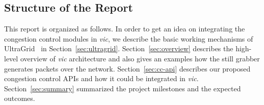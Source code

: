 \subsection{\label{ssec:structure}Structure of the Report}

This report is organized as follows. In order to get an idea on integrating the
congestion control modules in \emph{vic}, we describe the basic working
mechanisms of UltraGrid~\cite{UltraGrid} in Section~\ref{sec:ultragrid}.
Section~\ref{sec:overview} describes the high-level overview of \emph{vic}
architecture and also gives an examples how the still grabber generates packets
over the network. Section~\ref{sec:cc-api} describes our proposed congestion
control APIs and how it could be integrated in \emph{vic}.
Section~\ref{sec:summary} summarized the project milestones and the expected
outcomes.

\newpage

